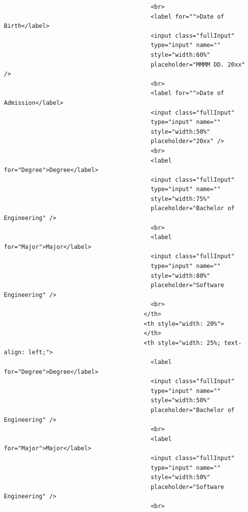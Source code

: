 \documentclass[12pt]{report} %
\begin{document}
\begin{verbatim}
                                          <br>
                                          <label for="">Date of Birth</label>
                                          <input class="fullInput"
                                          type="input" name=""
                                          style="width:60%"
                                          placeholder="MMMM DD. 20xx" />
                                          <br>
                                          <label for="">Date of Admission</label>
                                          <input class="fullInput"
                                          type="input" name=""
                                          style="width:50%"
                                          placeholder="20xx" />
                                          <br>
                                          <label for="Degree">Degree</label>
                                          <input class="fullInput"
                                          type="input" name=""
                                          style="width:75%"
                                          placeholder="Bachelor of Engineering" />
                                          <br>
                                          <label for="Major">Major</label>
                                          <input class="fullInput"
                                          type="input" name=""
                                          style="width:80%"
                                          placeholder="Software Engineering" />
                                          <br>
                                        </th>
                                        <th style="width: 20%">
                                        </th>
                                        <th style="width: 25%; text-align: left;">
                                          <label for="Degree">Degree</label>
                                          <input class="fullInput"
                                          type="input" name=""
                                          style="width:50%"
                                          placeholder="Bachelor of Engineering" />
                                          <br>
                                          <label for="Major">Major</label>
                                          <input class="fullInput"
                                          type="input" name=""
                                          style="width:50%"
                                          placeholder="Software Engineering" />
                                          <br>

\end{verbatim}
\end{document}
